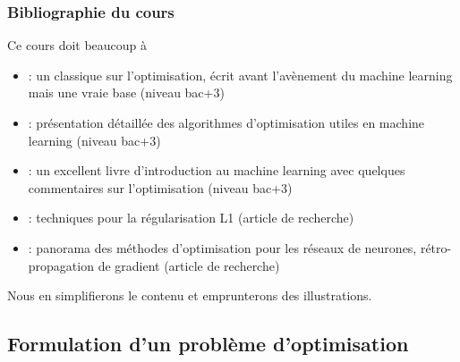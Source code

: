 \documentclass[12pt]{beamer}
\begin{document}
\begin{frame}
\frametitle{Bibliographie du cours}
Ce cours doit beaucoup à
\begin{itemize}
\item \cite{minoux2008programmation} : un classique sur l'optimisation, écrit avant l'avènement du machine learning mais une vraie base (niveau bac+3)
\item \cite{ravikumar17} : présentation détaillée des algorithmes d'optimisation utiles en machine learning (niveau bac+3)
\item \cite{bishop2006pattern} : un excellent livre d'introduction au machine learning avec quelques commentaires sur l'optimisation (niveau bac+3)
\item \cite{schmidt2007fast} : techniques pour la régularisation L1 (article de recherche)
\item \cite{sun2019optimization} : panorama des méthodes d'optimisation pour les réseaux de neurones, rétro-propagation de gradient (article de recherche)
\end{itemize}
Nous en simplifierons le contenu et emprunterons des illustrations.
\end{frame}

\subsection{Formulation d'un problème d'optimisation}
\end{document}
